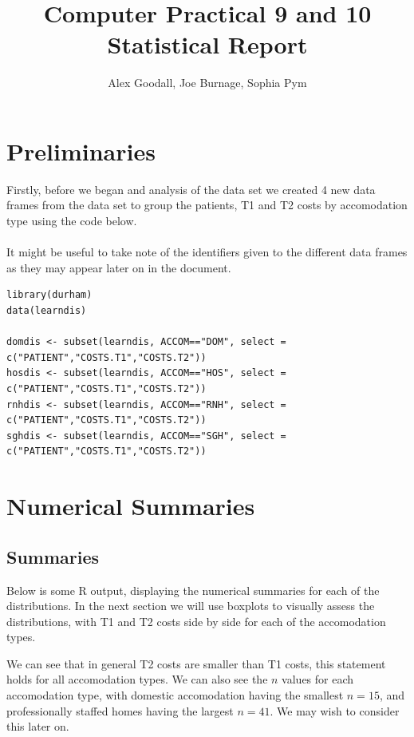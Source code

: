 \documentclass[]{article}
\title{Computer Practical 9 and 10 Statistical Report}
\author{Alex Goodall, Joe Burnage, Sophia Pym}
\begin{document}
\maketitle
\section{Preliminaries}
Firstly, before we began and analysis of the data set we created 4 new data frames from the data set to group the patients, T1 and T2 costs by accomodation type using the code below.
\\
\\
It might be useful to take note of the identifiers given to the different data frames as they may appear later on in the document.
\begin{lstlisting}
library(durham)
data(learndis)

domdis <- subset(learndis, ACCOM=="DOM", select = c("PATIENT","COSTS.T1","COSTS.T2"))
hosdis <- subset(learndis, ACCOM=="HOS", select = c("PATIENT","COSTS.T1","COSTS.T2"))
rnhdis <- subset(learndis, ACCOM=="RNH", select = c("PATIENT","COSTS.T1","COSTS.T2"))
sghdis <- subset(learndis, ACCOM=="SGH", select = c("PATIENT","COSTS.T1","COSTS.T2"))
\end{lstlisting}
\section{Numerical Summaries}
\subsection{Summaries}
Below is some R output, displaying the numerical summaries for each of the distributions. In the next section we will use boxplots to visually assess the distributions, with T1 and T2 costs side by side for each of the accomodation types.

We can see that in general T2 costs are smaller than T1 costs, this statement holds for all accomodation types. We can also see the $n$ values for each accomodation type, with domestic accomodation having the smallest $n = 15$, and professionally staffed homes having the largest $n=41$. We may wish to consider this later on.
\newpage
\end{document}
